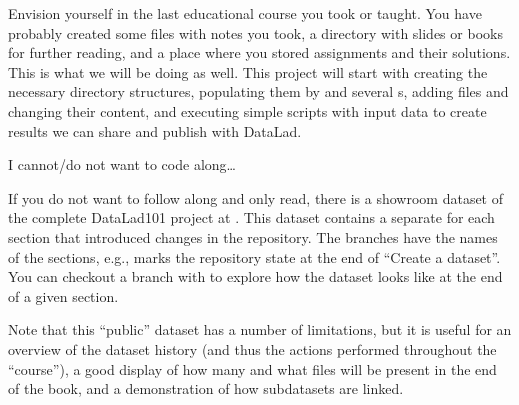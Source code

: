\sphinxAtStartPar
Envision yourself in the last educational course you took or taught.
You have probably created some files with notes you took, a directory
with slides or books for further reading, and a place where you stored
assignments and their solutions. This is what we will be doing as well.
This project will start with creating the necessary directory structures,
populating them by  and  several
{\hyperref[\detokenize{glossary:term-DataLad-subdataset}]{}}s, adding files and changing their content,
and executing simple scripts with input data to create results we can
share and publish with DataLad.

\begin{figure}[tbp]
\centering

\noindent{}
\end{figure}
\begin{findoutmore}[label={fom-lazy}, before title={\thetcbcounter\ }, float, check odd page=true]{I cannot/do not want to code along…}
\label{\detokenize{intro/narrative:fom-lazy}}

\sphinxAtStartPar
If you do not want to follow along and only read, there is a showroom dataset
of the complete DataLad\sphinxhyphen{}101 project at
.
This dataset contains a separate {\hyperref[\detokenize{glossary:term-branch}]{}} for each section that introduced changes
in the repository. The branches have the names of the sections, e.g.,
 marks the repository state at the end of “Create a dataset”. You can checkout a branch with 
to explore how the dataset looks like at the end of a given section.

\sphinxAtStartPar
Note that this “public” dataset has a number of limitations, but it is useful
for an overview of the dataset history (and thus the actions performed throughout
the “course”), a good display of how many and what files will be present in the
end of the book, and a demonstration of how subdatasets are linked.


\end{findoutmore}



